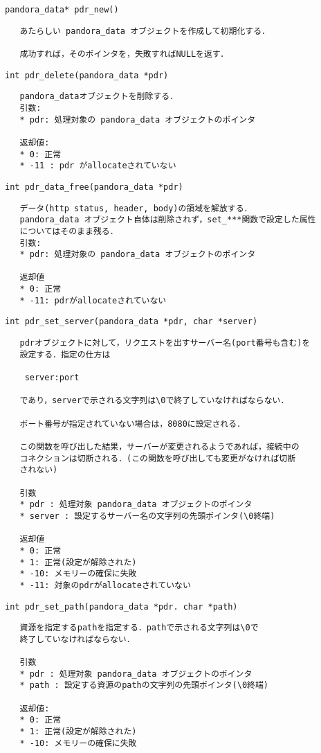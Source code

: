 {\large\verb|pandora_data* pdr_new()|}
\begin{verbatim}
   あたらしい pandora_data オブジェクトを作成して初期化する．

   成功すれば，そのポインタを，失敗すればNULLを返す．
\end{verbatim}
{\large\verb|int pdr_delete(pandora_data *pdr)|}
\begin{verbatim}
   pandora_dataオブジェクトを削除する．
   引数:
   * pdr: 処理対象の pandora_data オブジェクトのポインタ

   返却値:
   * 0: 正常
   * -11 : pdr がallocateされていない
\end{verbatim}
{\large\verb|int pdr_data_free(pandora_data *pdr)|}
\begin{verbatim}
   データ(http status, header, body)の領域を解放する．
   pandora_data オブジェクト自体は削除されず，set_***関数で設定した属性
   についてはそのまま残る．
   引数:
   * pdr: 処理対象の pandora_data オブジェクトのポインタ

   返却値
   * 0: 正常
   * -11: pdrがallocateされていない
\end{verbatim}
{\large\verb|int pdr_set_server(pandora_data *pdr, char *server)|}
\begin{verbatim}
   pdrオブジェクトに対して，リクエストを出すサーバー名(port番号も含む)を
   設定する．指定の仕方は

    server:port

   であり，serverで示される文字列は\0で終了していなければならない．

   ポート番号が指定されていない場合は，8080に設定される．

   この関数を呼び出した結果，サーバーが変更されるようであれば，接続中の
   コネクションは切断される．(この関数を呼び出しても変更がなければ切断
   されない)

   引数
   * pdr : 処理対象 pandora_data オブジェクトのポインタ
   * server : 設定するサーバー名の文字列の先頭ポインタ(\0終端)

   返却値
   * 0: 正常
   * 1: 正常(設定が解除された)
   * -10: メモリーの確保に失敗
   * -11: 対象のpdrがallocateされていない
\end{verbatim}
{\large\verb|int pdr_set_path(pandora_data *pdr. char *path)|}
\begin{verbatim}
   資源を指定するpathを指定する．pathで示される文字列は\0で
   終了していなければならない．

   引数
   * pdr : 処理対象 pandora_data オブジェクトのポインタ
   * path : 設定する資源のpathの文字列の先頭ポインタ(\0終端)

   返却値:
   * 0: 正常
   * 1: 正常(設定が解除された)
   * -10: メモリーの確保に失敗
\end{verbatim}
